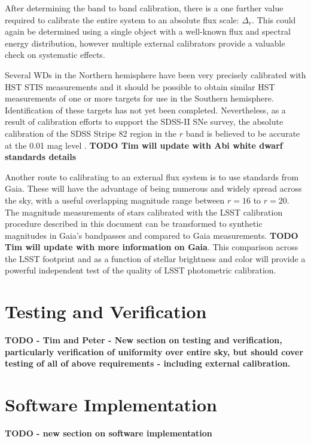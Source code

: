 \documentclass[12pt,preprint]{aastex}
\begin{document}
After determining the band to band calibration, there is a one further
value required to calibrate the entire system to an absolute flux
scale: $\Delta_r$.  This could again be determined using a single
object with a well-known flux and spectral energy distribution,
however multiple external calibrators provide a valuable check on
systematic effects. 

Several WDs in the Northern hemisphere have been very precisely
calibrated with HST STIS measurements \citep{2004AJ....128.3053B} and
it should be possible to obtain similar HST measurements of one or
more targets for use in the Southern hemisphere. Identification of
these targets has not yet been completed. Nevertheless, as a result of
calibration efforts to support the SDSS-II SNe survey, the absolute
calibration of the SDSS Stripe 82 region in the $r$ band is believed
to be accurate at the 0.01 mag level \citep{Frieman2008}. 
{\bf TODO Tim will update with Abi white dwarf standards details}

Another route to calibrating to an external flux system is to use
standards from Gaia. These will have the advantage of being numerous
and widely spread across the sky, with a useful overlapping magnitude range between
$r=16$ to $r=20$.  The magnitude measurements of stars calibrated with
the LSST calibration procedure described in this document can be
transformed to synthetic magnitudes in Gaia's bandpasses and compared
to Gaia measurements. 
{\bf TODO Tim will update with more information on Gaia}.
 This comparison across the LSST footprint and as
a function of stellar brightness and color will provide a powerful
independent test of the quality of LSST photometric calibration. 

\section{Testing and Verification}
\label{sec:verification}

{\bf TODO - Tim and Peter -  New section on testing and verification, particularly verification of uniformity over entire sky, but should cover testing of all of above requirements - including external calibration.}


\section{Software Implementation}
\label{sec:software}

{\bf TODO - new section on software implementation } 
\end{document}
